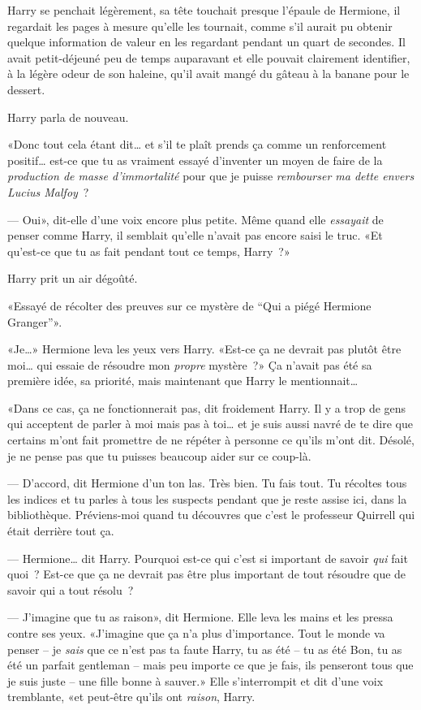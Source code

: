 Harry se penchait légèrement, sa tête touchait presque l'épaule de Hermione, il regardait les pages à mesure qu'elle les tournait, comme s'il aurait pu obtenir quelque information de valeur en les regardant pendant un quart de secondes. Il avait petit-déjeuné peu de temps auparavant et elle pouvait clairement identifier, à la légère odeur de son haleine, qu'il avait mangé du gâteau à la banane pour le dessert.

Harry parla de nouveau.

«Donc tout cela étant dit… et s'il te plaît prends ça comme un renforcement positif… est-ce que tu as vraiment essayé d'inventer un moyen de faire de la \emph{production de masse d'immortalité} pour que je puisse \emph{rembourser ma dette envers Lucius Malfoy}~?

--- Oui», dit-elle d'une voix encore plus petite. Même quand elle \emph{essayait} de penser comme Harry, il semblait qu'elle n'avait pas encore saisi le truc. «Et qu'est-ce que tu as fait pendant tout ce temps, Harry~?»

Harry prit un air dégoûté.

«Essayé de récolter des preuves sur ce mystère de “Qui a piégé Hermione Granger”».

«Je…» Hermione leva les yeux vers Harry. «Est-ce ça ne devrait pas plutôt être moi… qui essaie de résoudre mon \emph{propre} mystère~?» Ça n'avait pas été sa première idée, sa priorité, mais maintenant que Harry le mentionnait…

«Dans ce cas, ça ne fonctionnerait pas, dit froidement Harry. Il y a trop de gens qui acceptent de parler à moi mais pas à toi… et je suis aussi navré de te dire que certains m'ont fait promettre de ne répéter à personne ce qu'ils m'ont dit. Désolé, je ne pense pas que tu puisses beaucoup aider sur ce coup-là.

--- D'accord, dit Hermione d'un ton las. Très bien. Tu fais tout. Tu récoltes tous les indices et tu parles à tous les suspects pendant que je reste assise ici, dans la bibliothèque. Préviens-moi quand tu découvres que c'est le professeur Quirrell qui était derrière tout ça.

--- Hermione… dit Harry. Pourquoi est-ce qui c'est si important de savoir \emph{qui} fait quoi~? Est-ce que ça ne devrait pas être plus important de tout résoudre que de savoir qui a tout résolu~?

--- J'imagine que tu as raison», dit Hermione. Elle leva les mains et les pressa contre ses yeux. «J'imagine que ça n'a plus d'importance. Tout le monde va penser -- je \emph{sais} que ce n'est pas ta faute Harry, tu as été -- tu as été Bon, tu as été un parfait gentleman -- mais peu importe ce que je fais, ils penseront tous que je suis juste -- une fille bonne à sauver.» Elle s'interrompit et dit d'une voix tremblante, «et peut-être qu'ils ont \emph{raison}, Harry.

